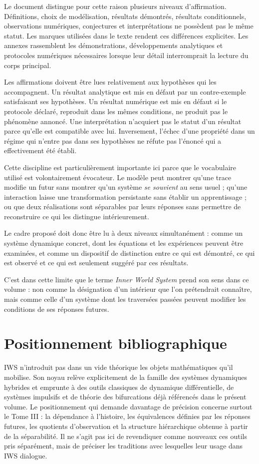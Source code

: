 \documentclass[
  11pt,
  a4paper,
  openany]{book}
\theoremstyle{definition}
\begin{document}
Le document distingue pour cette raison plusieurs niveaux d'affirmation. Définitions, choix de modélisation, résultats démontrés, résultats conditionnels, observations numériques, conjectures et interprétations ne possèdent pas le même statut. Les marques utilisées dans le texte rendent ces différences explicites. Les annexes rassemblent les démonstrations, développements analytiques et protocoles numériques nécessaires lorsque leur détail interromprait la lecture du corps principal.

Les affirmations doivent être lues relativement aux hypothèses qui les accompagnent. Un résultat analytique est mis en défaut par un contre-exemple satisfaisant ses hypothèses. Un résultat numérique est mis en défaut si le protocole déclaré, reproduit dans les mêmes conditions, ne produit pas le phénomène annoncé. Une interprétation n'acquiert pas le statut d'un résultat parce qu'elle est compatible avec lui. Inversement, l'échec d'une propriété dans un régime qui n'entre pas dans ses hypothèses ne réfute pas l'énoncé qui a effectivement été établi.

Cette discipline est particulièrement importante ici parce que le vocabulaire utilisé est volontairement évocateur. Le modèle peut montrer qu'une trace modifie un futur sans montrer qu'un système \emph{se souvient} au sens usuel ; qu'une interaction laisse une transformation persistante sans établir un apprentissage ; ou que deux réalisations sont séparables par leurs réponses sans permettre de reconstruire ce qui les distingue intérieurement.

Le cadre proposé doit donc être lu à deux niveaux simultanément : comme un système dynamique concret, dont les équations et les expériences peuvent être examinées, et comme un dispositif de distinction entre ce qui est démontré, ce qui est observé et ce qui est seulement suggéré par ces résultats.

C'est dans cette limite que le terme \emph{Inner World System} prend son sens dans ce volume : non comme la désignation d'un intérieur que l'on prétendrait connaître, mais comme celle d'un système dont les traversées passées peuvent modifier les conditions de ses réponses futures.

\chapter*{Positionnement bibliographique}
IWS n’introduit pas dans un vide théorique les objets mathématiques qu’il mobilise. Son noyau relève explicitement de la famille des systèmes dynamiques hybrides et emprunte à des outils classiques de dynamique différentielle, de systèmes impulsifs et de théorie des bifurcations déjà référencés dans le présent volume.  Le positionnement qui demande davantage de précision concerne surtout le Tome III : la dépendance à l’histoire, les équivalences définies par les réponses futures, les quotients d’observation et la structure hiérarchique obtenue à partir de la séparabilité. Il ne s’agit pas ici de revendiquer comme nouveaux ces outils pris séparément, mais de préciser les traditions avec lesquelles leur usage dans IWS dialogue.
\end{document}
